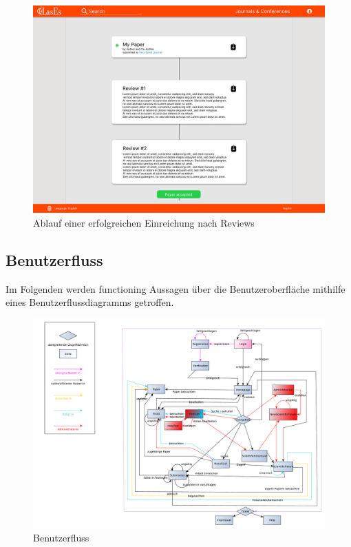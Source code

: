 \begin{figure}[H]
	\centering
	\includegraphics[width=0.85\linewidth]{graphics/Paper}
	\caption{Ablauf einer erfolgreichen Einreichung nach Reviews}
	\label{fig:paperMockup}
\end{figure}


\subsection{Benutzerfluss}
Im Folgenden werden functioning Aussagen über die Benutzeroberfläche mithilfe eines Benutzerflussdiagramms getroffen.

\begin{figure}[H]
    \centering
    \includegraphics[width=\linewidth]{graphics/benutzerFlussyEd}
    \caption{Benutzerfluss}
	\label{fig:benutzerfluss}
\end{figure}

